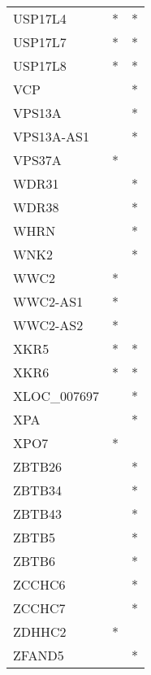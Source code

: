 \begin{longtable}{lcc}
USP17L4               &              * &          * \\
USP17L7               &              * &          * \\
USP17L8               &              * &          * \\
VCP                   &                &          * \\
VPS13A                &                &          * \\
VPS13A-AS1            &                &          * \\
VPS37A                &              * &            \\
WDR31                 &                &          * \\
WDR38                 &                &          * \\
WHRN                  &                &          * \\
WNK2                  &                &          * \\
WWC2                  &              * &            \\
WWC2-AS1              &              * &            \\
WWC2-AS2              &              * &            \\
XKR5                  &              * &          * \\
XKR6                  &              * &          * \\
XLOC\_007697           &                &          * \\
XPA                   &                &          * \\
XPO7                  &              * &            \\
ZBTB26                &                &          * \\
ZBTB34                &                &          * \\
ZBTB43                &                &          * \\
ZBTB5                 &                &          * \\
ZBTB6                 &                &          * \\
ZCCHC6                &                &          * \\
ZCCHC7                &                &          * \\
ZDHHC2                &              * &            \\
ZFAND5                &                &          * \\

\end{longtable}
